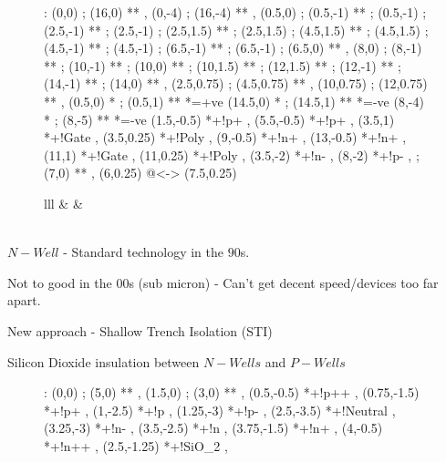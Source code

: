 \documentclass[a4paper,12pt]{article}
\begin{document}
\begin{figure}[ht]

\xy<1cm,0cm>:
(0,0)     ; (16,0) **\dir{-} ,
(0,-4)    ; (16,-4) **\dir{-} ,
%
(0.5,0)   ; (0.5,-1) **\dir{-} ;
(0.5,-1)  ; (2.5,-1) **\dir{-} ;
(2.5,-1)  ; (2.5,1.5) **\dir{-} ;
(2.5,1.5) ; (4.5,1.5) **\dir{-} ;
(4.5,1.5) ; (4.5,-1) **\dir{-} ;
(4.5,-1)  ; (6.5,-1) **\dir{-} ;
(6.5,-1)  ; (6.5,0) **\dir{-} ,
%
(8,0)		 ; (8,-1) **\dir{-} ;
(10,-1) **\dir{-}  ;
(10,0) **\dir{-}	 ;
(10,1.5) **\dir{-} ;
(12,1.5) **\dir{-} ;
(12,-1) **\dir{-}	 ;
(14,-1) **\dir{-}	 ;
(14,0) **\dir{-} ,
%
(2.5,0.75) ; (4.5,0.75) **\dir{-} ,
(10,0.75) ; (12,0.75) **\dir{-} ,
%
\POS (0.5,0) *{\bullet} ; (0.5,1) **\dir{-} *={+ve}
\POS (14.5,0) *{\bullet} ; (14.5,1) **\dir{-} *={-ve}
\POS (8,-4) *{\bullet} ; (8,-5) **\dir{-} *={-ve}
%
\POS (1.5,-0.5) *+!{p+} ,
\POS (5.5,-0.5) *+!{p+} ,
\POS (3.5,1)    *+!{Gate} ,
\POS (3.5,0.25)    *+!{Poly} ,
%
\POS (9,-0.5) *+!{n+} ,
\POS (13,-0.5) *+!{n+} ,
\POS (11,1)    *+!{Gate} ,
\POS (11,0.25)    *+!{Poly} ,
%
\POS (3.5,-2) *+!{n-} ,
\POS (8,-2) *+!{p-} ,
%
 ; (7,0) ** ,
%
\POS (6,0.25) \ar @{<->} (7.5,0.25)
\endxy

\end{figure}

\vspace{10mm}

\begin{figure}[ht]

\begin{tabular}{lll}
	&	&		\\
 \\
\end{tabular}

\end{figure}

$N-Well$ - Standard technology in the $90$s.

Not to good in the $00$s (sub micron) - Can't get decent speed/devices
too far apart.

New approach - Shallow Trench Isolation (STI)

Silicon Dioxide insulation between $N-Wells$ and $P-Wells$

\begin{figure}[ht]

\xy<1cm,0cm>:
(0,0) ; (5,0) **\dir{-} ,
(1.5,0) ; (3,0) ** ,
\POS (0.5,-0.5) *+!{p++} ,
\POS (0.75,-1.5) *+!{p+} ,
\POS (1,-2.5) *+!{p} ,
\POS (1.25,-3) *+!{p-} ,
\POS (2.5,-3.5) *+!{Neutral} ,
\POS (3.25,-3) *+!{n-} ,
\POS (3.5,-2.5) *+!{n} ,
\POS (3.75,-1.5) *+!{n+} ,
\POS (4,-0.5) *+!{n++} ,
\POS (2.5,-1.25) *+!{SiO_{2}} ,
\endxy

\end{figure}
\end{document}
